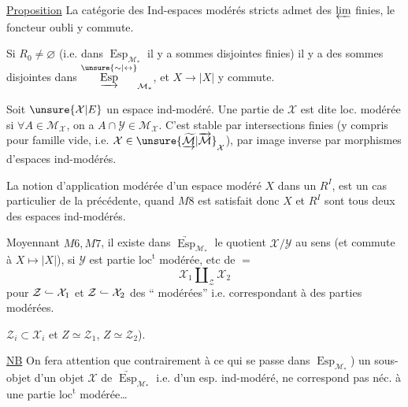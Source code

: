 \uline{Proposition} La catégorie des   Ind-espaces modérés stricts admet des $\varprojlim$ finies, le foncteur oubli y commute.

Si $R_0\ne\varnothing$ (i.e. dans $\operatorname{Esp}_{\mathcal M_*}$ il y a sommes disjointes finies) il y a des sommes disjointes   dans $\overset{\unsure{\sim|\leftrightarrow}}{\underrightarrow{\operatorname{Esp}}}_{\mathcal M_*}$, et $X\longrightarrow |X|$ y commute.

Soit $\unsure{\mathcal X|E}$ un espace ind-modéré. Une partie  de $\mathcal X$ est dite loc. modérée si $\forall A\in\mathcal M_{\mathcal X}$, on a $A\cap\mathcal Y\in\mathcal M_{\mathcal X}$. C'est stable par intersections finies (y compris pour famille vide, i.e. $\mathcal X\in\unsure{\underrightarrow{\widetilde{\mathcal M}}|\overrightarrow{\mathcal M}}_{\mathcal X}$), par image inverse par morphismes  d'espaces ind-modérés.

La notion d'application modérée d'un espace modéré $X$ dans un $R^I$, est un cas particulier de la précédente, quand $M8$ est satisfait donc $X$ et $R^I$ sont tous deux des espaces ind-modérés.

Moyennant $M6,M7$, il existe  dans $\underrightarrow{\operatorname{Esp}}_{\mathcal M_*}$ le quotient $\mathcal X/\mathcal Y$ au sens (et commute à $X\mapsto|X|$), si $\mathcal Y$ est partie $\mathrm{loc}^{\mathrm t}$ modérée, etc de $=$
\[
 \mathcal X_1\amalg_{\mathcal Z}\mathcal X_2
\]
pour $\mathcal Z\lhook\joinrel\relbar\mathcal X_1$ et $\mathcal Z\lhook\joinrel\relbar\mathcal X_2$ des `` modérées'' i.e. correspondant à des parties  modérées.

$\mathcal Z_i\subset\mathcal X_i$ et $Z\simeq\mathcal Z_1$, $Z\simeq\mathcal Z_2$).

\uline{NB} On fera attention que contrairement à ce qui se passe dans $\operatorname{Esp}_{\mathcal M_*}$) un sous-objet d'un objet $\mathcal X$ de $\underrightarrow{\operatorname{Esp}}_{\mathcal M_*}$ i.e. d'un esp. ind-modéré, ne correspond pas néc. à une partie $\mathrm{loc}^{\mathrm t}$ modérée\ldots

